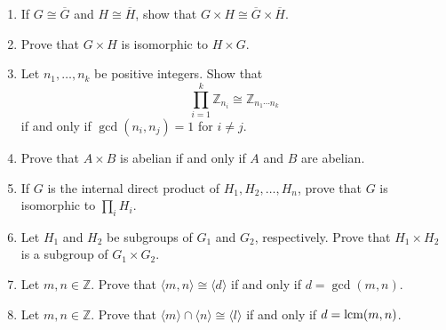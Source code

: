 {\begin{enumerate}
\item
If $G \cong \overline{G}$ and $H \cong \overline{H}$, show that $G
\times H \cong \overline{G} \times \overline{H}$.
 

\item
Prove that $G \times H$ is isomorphic to $H \times G$.
 

\item
Let $n_1, \ldots, n_k$ be positive integers. Show that
\[
\prod_{i=1}^k {\mathbb Z}_{n_i} \cong {\mathbb Z}_{n_1 \cdots n_k}
\]
if and only if $\gcd( n_i, n_j) =1$ for $i \neq j$.
 

\item
Prove that $A \times B$ is abelian if and only if $A$ and $B$ are
abelian. 
 

\item
If $G$ is the internal direct product of $H_1, H_2, \ldots, H_n$,
prove that $G$ is isomorphic to $\prod_i H_i$. 
 

\item
Let $H_1$ and $H_2$ be subgroups of $G_1$ and $G_2$, respectively. Prove that $H_1 \times H_2$ is a subgroup of $G_1 \times G_2$. 
 

\item
Let $m, n \in {\mathbb Z}$. Prove that $\langle m,n \rangle \cong \langle d \rangle$ if and only if $d = \gcd(m,n)$.
 

\item
Let $m, n \in {\mathbb Z}$. Prove that $\langle m \rangle \cap \langle n \rangle \cong \langle l \rangle$ if and only if $d = \operatorname{lcm}(m,n)$. 
 
\end{enumerate}
}





